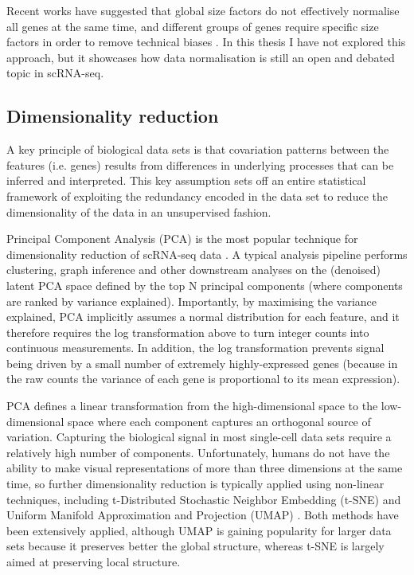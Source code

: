 Recent works have suggested that global size factors do not effectively normalise all genes at the same time, and different groups of genes require specific size factors in order to remove technical biases \cite{Hafemeister2019}. In this thesis I have not explored this approach, but it showcases how data normalisation is still an open and debated topic in scRNA-seq.

\subsection{Dimensionality reduction}

A key principle of biological data sets is that covariation patterns between the features (i.e. genes) results from differences in underlying processes that can be inferred and interpreted. This key assumption sets off an entire statistical framework of exploiting the redundancy encoded in the data set to reduce the dimensionality of the data in an unsupervised fashion.

Principal Component Analysis (PCA) is the most popular technique for dimensionality reduction of scRNA-seq data \cite{Luecken2019}. A typical analysis pipeline performs clustering, graph inference and other downstream analyses on the (denoised) latent PCA space defined by the top N principal components (where components are ranked by variance explained). Importantly, by maximising the variance explained, PCA implicitly assumes a normal distribution for each feature, and it therefore requires the log transformation above to turn integer counts into continuous measurements. In addition, the log transformation prevents signal being driven by a small number of extremely highly-expressed genes (because in the raw counts the variance of each gene is proportional to its mean expression). 

PCA defines a linear transformation from the high-dimensional space to the low-dimensional space where each component captures an orthogonal source of variation. Capturing the biological signal in most single-cell data sets require a relatively high number of components. Unfortunately, humans do not have the ability to make visual representations of more than three dimensions at the same time, so further dimensionality reduction is typically applied using non-linear techniques, including t-Distributed Stochastic Neighbor Embedding (t-SNE) \cite{vanDerMaaten2008} and Uniform Manifold Approximation and Projection (UMAP) \cite{McInnes2018}. Both methods have been extensively applied, although UMAP is gaining popularity for larger data sets because it preserves better the global structure, whereas t-SNE is largely aimed at preserving local structure. 

